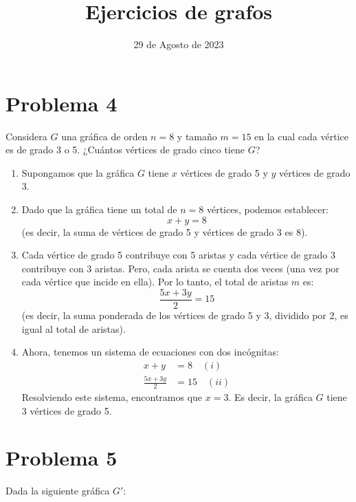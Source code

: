 \documentclass[12pt]{article}
\title{Ejercicios de grafos}
\date{29 de Agosto de 2023}
\begin{document}
\maketitle

\section*{Problema 4}
Considera \( G \) una gráfica de orden \( n = 8 \) y tamaño \( m = 15 \) en la cual cada vértice es de grado 3 o 5. ¿Cuántos vértices de grado cinco tiene \( G \)?
\begin{enumerate}
	\item Supongamos que la gráfica \( G \) tiene \( x \) vértices de grado 5 y \( y \) vértices de grado 3.
	\item Dado que la gráfica tiene un total de \( n = 8 \) vértices, podemos establecer:
	      \[ x + y = 8 \]
	      (es decir, la suma de vértices de grado 5 y vértices de grado 3 es 8).
	\item Cada vértice de grado 5 contribuye con 5 aristas y cada vértice de grado 3 contribuye con 3 aristas. Pero, cada arista se cuenta dos veces (una vez por cada vértice que incide en ella). Por lo tanto, el total de aristas \( m \) es:
	      \[ \frac{5x + 3y}{2} = 15 \]
	      (es decir, la suma ponderada de los vértices de grado 5 y 3, dividido por 2, es igual al total de aristas).
	\item Ahora, tenemos un sistema de ecuaciones con dos incógnitas:
	      \begin{align*}
		      x + y             & = 8 \quad (i)   \\
		      \frac{5x + 3y}{2} & = 15 \quad (ii)
	      \end{align*}
	      Resolviendo este sistema, encontramos que \( x = 3 \). Es decir, la gráfica \( G \) tiene 3 vértices de grado 5.
\end{enumerate}



\section*{Problema 5}
Dada la siguiente gráfica \( G' \):
\end{document}
